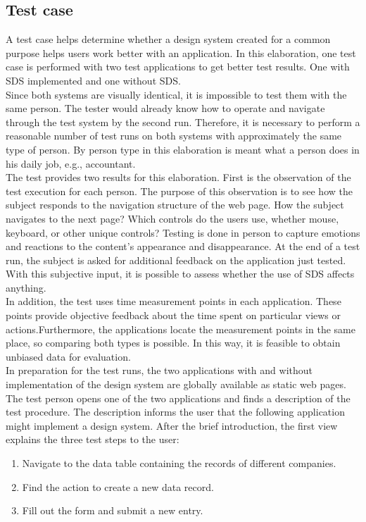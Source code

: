 \subsection{Test case}\label{text_case}
A test case helps determine whether a design system created for a common purpose helps users work better with an application. In this elaboration, one test case is performed with two test applications to get better test results. One with \ac{SDS} implemented and one without \ac{SDS}.  \\
Since both systems are visually identical, it is impossible to test them with the same person. The tester would already know how to operate and navigate through the test system by the second run. Therefore, it is necessary to perform a reasonable number of test runs on both systems with approximately the same type of person. By person type in this elaboration is meant what a person does in his daily job, e.g., accountant.  \\
The test provides two results for this elaboration. First is the observation of the test execution for each person. The purpose of this observation is to see how the subject responds to the navigation structure of the web page. How the subject navigates to the next page? Which controls do the users use, whether mouse, keyboard, or other unique controls? Testing is done in person to capture emotions and reactions to the content's appearance and disappearance. At the end of a test run, the subject is asked for additional feedback on the application just tested. With this subjective input, it is possible to assess whether the use of \ac{SDS} affects anything. \\
In addition, the test uses time measurement points in each application. These points provide objective feedback about the time spent on particular views or actions.Furthermore, the applications locate the measurement points in the same place, so comparing both types is possible. In this way, it is feasible to obtain unbiased data for evaluation. \\
In preparation for the test runs, the two applications with and without implementation of the design system are globally available as static web pages. The test person opens one of the two applications and finds a description of the test procedure. The description informs the user that the following application might implement a design system. After the brief introduction, the first view explains the three test steps to the user:

\begin{enumerate}
    \item Navigate to the data table containing the records of different companies.
    \item Find the action to create a new data record.
    \item Fill out the form and submit a new entry.
\end{enumerate}

